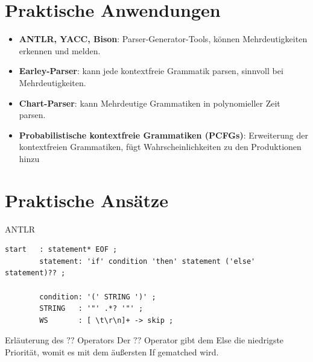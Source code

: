 \documentclass[t]{beamer}
\begin{document}
	\section{Praktische Anwendungen}\label{sec:praktische-ansatze1}
	\begin{frame}
        \vspace{3em}
	\begin{itemize}
		\item \textbf{ANTLR, YACC, Bison}: Parser-Generator-Tools, können Mehrdeutigkeiten erkennen und melden.
		\vspace{1em}
		\item \textbf{Earley-Parser}: kann jede kontextfreie Grammatik parsen, sinnvoll bei Mehrdeutigkeiten.\cite{qi2018generalized}
		\vspace{1em}
		\item \textbf{Chart-Parser}: kann Mehrdeutige Grammatiken in polynomieller Zeit parsen.
		\vspace{1em}
		\item \textbf{Probabilistische kontextfreie Grammatiken (PCFGs)}: Erweiterung der kontextfreien Grammatiken, fügt Wahrscheinlichkeiten zu den Produktionen hinzu
	\end{itemize}
	\end{frame}


	\section{Praktische Ansätze}\label{sec:praktische-ansatze2}
	\begin{frame}[fragile]
		\begin{block}{ANTLR}
			\hspace*{-3.5em}
			\begin{minipage}{\textwidth+3.5em}
				\begin{lstlisting}[style=antlr,label={lst:lstlisting3}]
        start   : statement* EOF ;
        statement: 'if' condition 'then' statement ('else' statement)?? ;

        condition: '(' STRING ')' ;
        STRING   : '"' .*? '"' ;
        WS       : [ \t\r\n]+ -> skip ;
                \end{lstlisting}
			\end{minipage}
		\end{block}
		\vspace{1em}
		\begin{exampleblock}{Erläuterung des \(??\) Operators \cite{parr}}
			Der \(??\) Operator gibt dem Else die niedrigste Priorität, womit es mit dem äußersten If gematched wird.
		\end{exampleblock}
	\end{frame}
\end{document}
